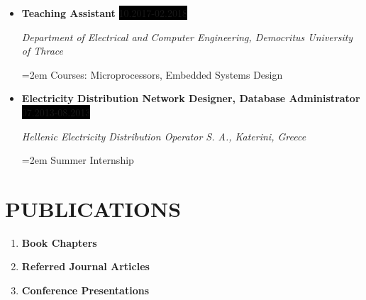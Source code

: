 \documentclass[paper=a4,fontsize=11pt]{scrartcl} %
\newcommand{\sepspace}{\vspace*{1em}}		%
\newcommand{\NewPart}[1]{\section*{\uppercase{#1}}}
\newcommand{\EducationEntry}[4]{
		\noindent \textbf{#1} \hfill      %
		\colorbox{Black}{%
			\parbox{6em}{%
			\hfill\color{White}#2}} \par  %
		\noindent \textit{#3} \par        %
		\noindent\hangindent=2em\hangafter=0 \small #4 %
		\normalsize \par}
\newcommand{\WorkEntry}[4]{				  %
		\noindent \textbf{#1} \hfill      %
		\colorbox{Black}{\color{White}#2} \par  %
		\noindent \textit{#3} \par              %
		\noindent\hangindent=2em\hangafter=0 \small #4 %
		\normalsize \par}
\begin{document}
\begin{itemize}[leftmargin=*]
    \item \WorkEntry{Teaching Assistant}{\footnotesize 10.2017-02.2018}{Department of Electrical and Computer Engineering, Democritus University of Thrace}{Courses: Microprocessors, Embedded Systems Design}
    \item \WorkEntry{Electricity Distribution Network Designer, Database Administrator}{\footnotesize 07.2013-08.2013}{Hellenic Electricity Distribution Operator S. A., Katerini, Greece}{Summer Internship}
\end{itemize}
\sepspace





\NewPart{Publications}

\begin{enumerate}[label=\textbf{\Alph*.},leftmargin=*]
    \item   \textbf{Book Chapters}
            \begin{refsection}
            \nocite{*}
            \printbibliography[heading=none]
            \end{refsection}
    \item   \textbf{Referred Journal Articles}
            \begin{refsection}
            \nocite{*}
            \printbibliography[heading=none]
            \end{refsection}
    \item   \textbf{Conference Presentations}
            \begin{refsection}
            \nocite{*}
            \printbibliography[heading=none]
            \end{refsection}
\end{enumerate}
\end{document}
